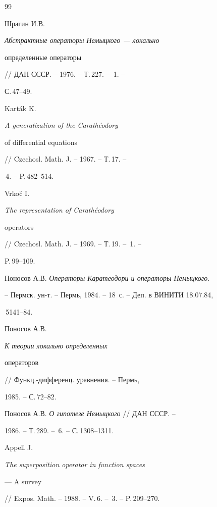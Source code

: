 \begin{thebibliography}{99}





 Шрагин И.В. {\it Абстрактные операторы Немыцкого --- локально


определенные операторы} // ДАН СССР. -- 1976. -- Т.\,227. -- \No\,1. --


С.\,47--49.





 Kart\'{a}k K. {\it A generalization of the Carath\'{e}odory


of differential equations} // Czechosl. Math. J. -- 1967. -- Т.\,17. --


\No\,4. -- P.\,482--514.





 Vrko\u{c} I. {\it The representation of Carath\'{e}odory


operators} // Czechosl. Math. J. -- 1969. -- Т.\,19. -- \No\,1. --


P.\,99--109.





 Поносов А.В. {\it Операторы Каратеодори и операторы Немыцкого}.


-- Пермск. ун-т. -- Пермь, 1984. -- 18~с. -- Деп. в ВИНИТИ 18.07.84,


\No\,5141--84.





 Поносов А.В. {\it К теории локально определенных


операторов} // Функц.-дифференц. уравнения. -- Пермь,


1985. -- С.\,72--82.





 Поносов А.В. {\it О гипотезе Немыцкого} // ДАН СССР. --


1986. -- Т.\,289. -- \No\,6. -- С.\,1308--1311.





 Appell J. {\it The superposition operator in function spaces


--- A survey} // Expos. Math. -- 1988. -- V.\,6. -- \No\,3. -- P.\,209--270.






\end{thebibliography}
